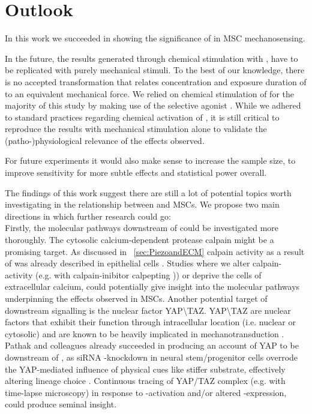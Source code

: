 \chapter{Outlook}
In this work we succeeded in showing the significance of \Piezo{} in MSC mechanosensing.

In the future, the results generated through chemical stimulation with \Yoda{}, have to be replicated with purely mechanical stimuli. To the best of our knowledge, there is no accepted transformation that relates concentration and exposure duration of \Yoda{} to an equivalent mechanical force. We relied on chemical stimulation of \Piezo{} for the majority of this study by making use of the selective \Piezo{} agonist \Yoda{}. While we adhered to standard practices regarding chemical activation of \Piezo{}\cite{Morley2018}, it is still critical to reproduce the results with mechanical stimulation alone to validate the (patho-)physiological relevance of the effects observed. \par

For future experiments it would also make sense to increase the sample size, to improve sensitivity for more subtle effects and statistical power overall. \par

The findings of this work suggest there are still a lot of potential topics worth investigating in the relationship between \Piezo{} and MSCs. We propose two main directions in which further research could go:\\
Firstly, the molecular pathways downstream of \Piezo{} could be investigated more thoroughly. The cytosolic calcium-dependent protease calpain might be a promising target. As discussed in ~\vref{sec:PiezoandECM} calpain activity as a result of \Piezo{} was already described in epithelial cells \cite{McHugh2010}. Studies where we alter calpain-activity (e.g. with calpain-inibitor calpepting \cite{Schoenwaelder1999})) or deprive the cells of extracellular calcium, could potentially give insight into the molecular pathways underpinning the effects observed in MSCs. Another potential target of \Piezo{} downstream signalling is the nuclear factor YAP\textbackslash{}TAZ. YAP\textbackslash{}TAZ are nuclear factors that exhibit their function through intracellular location (i.e. nuclear or cytosolic) and are known to be heavily implicated in mechanotransduction \cite{Dupont2011}. Pathak and colleagues already succeeded in producing an account of YAP to be downstream of \Piezo{}, as siRNA \Piezo{}-knockdown in neural stem/progenitor cells overrode the YAP-mediated influence of physical cues like stiffer substrate, effectively altering lineage choice \cite{Pathak2014}. Continuous tracing of YAP/TAZ complex (e.g. with time-lapse microscopy) in response to \Yoda{}-activation and/or altered \Piezo{}-expression, could produce seminal insight.\par

